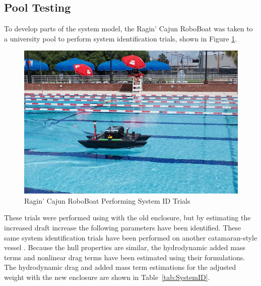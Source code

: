 \documentclass[letterpaper, 12 pt, conference]{ieeeconf}
\begin{document}
\subsection{Pool Testing}
To develop parts of the system model, the Ragin' Cajun RoboBoat was taken to a university pool to perform system identification trials, shown in Figure \ref{fig:PoolTesting}.
%
\begin{figure}[tb]
\centering
\vspace{0.05in}
\includegraphics[width=\columnwidth]{Figures/PoolTesting.jpg}
\caption{Ragin' Cajun RoboBoat Performing System ID Trials}
\label{fig:PoolTesting}
\end{figure}
%
These trials were performed using with the old enclosure, but by estimating the increased draft increase the following parameters have been identified. These same system identification trials have been performed on another catamaran-style vessel \cite{Klinger:17a, Sarda:16a}. Because the hull properties are similar, the hydrodynamic added mass terms and nonlinear drag terms have been estimated using their formulations. The  hydrodynamic drag and added mass term estimations for the adjusted weight with the new enclosure are shown in Table~\ref{tab:SystemID}.
%
\end{document}
